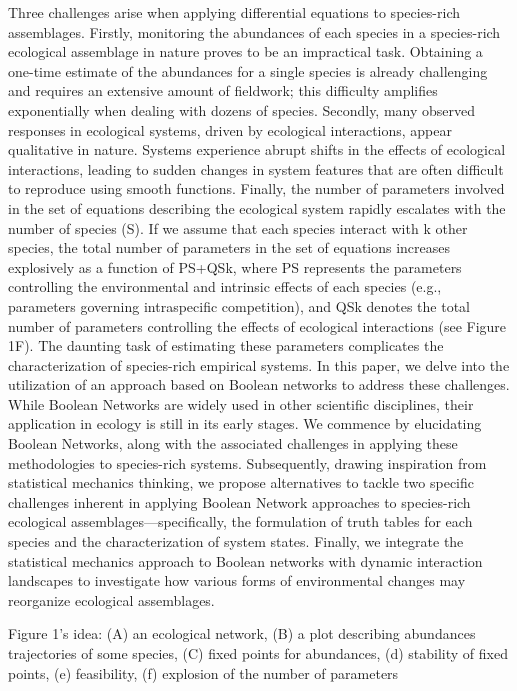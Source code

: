 \documentclass[10pt]{article}
\begin{document}
	Three challenges arise when applying differential equations to species-rich assemblages. Firstly, monitoring the abundances of each species in a species-rich ecological assemblage in nature proves to be an impractical task. Obtaining a one-time estimate of the abundances for a single species is already challenging and requires an extensive amount of fieldwork; this difficulty amplifies exponentially when dealing with dozens of species. Secondly, many observed responses in ecological systems, driven by ecological interactions, appear qualitative in nature. Systems experience abrupt shifts in the effects of ecological interactions, leading to sudden changes in system features that are often difficult to reproduce using smooth functions. Finally, the number of parameters involved in the set of equations describing the ecological system rapidly escalates with the number of species (S). If we assume that each species interact with k other species, the total number of parameters in the set of equations increases explosively as a function of PS+QSk, where PS represents the parameters controlling the environmental and intrinsic effects of each species (e.g., parameters governing intraspecific competition), and QSk denotes the total number of parameters controlling the effects of ecological interactions (see Figure 1F). The daunting task of estimating these parameters complicates the characterization of species-rich empirical systems. 
	In this paper, we delve into the utilization of an approach based on Boolean networks to address these challenges. While Boolean Networks are widely used in other scientific disciplines, their application in ecology is still in its early stages. We commence by elucidating Boolean Networks, along with the associated challenges in applying these methodologies to species-rich systems. Subsequently, drawing inspiration from statistical mechanics thinking, we propose alternatives to tackle two specific challenges inherent in applying Boolean Network approaches to species-rich ecological assemblages—specifically, the formulation of truth tables for each species and the characterization of system states. Finally, we integrate the statistical mechanics approach to Boolean networks with dynamic interaction landscapes to investigate how various forms of environmental changes may reorganize ecological assemblages.


Figure 1’s idea: (A) an ecological network, (B) a plot describing abundances trajectories of some species, (C) fixed points for abundances, (d) stability of fixed points, (e) feasibility, (f) explosion of the number of parameters
\end{document}
